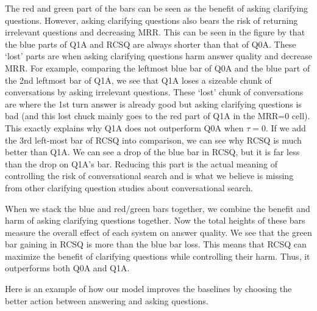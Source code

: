 \documentclass[format=acmsmall, review=False, screen=true]{acmart}
\begin{document}
The red and green part of the bars can be seen as the benefit of asking clarifying questions. However, asking clarifying questions also bears the risk of returning irrelevant questions and decreasing MRR. This can be seen in the figure by that the blue parts of Q1A and RCSQ are always shorter than that of Q0A. These `lost' parts are when asking clarifying questions harm answer quality and decrease MRR. For example, comparing the leftmost blue bar of Q0A and the blue part of the 2nd leftmost bar of Q1A, we see that Q1A loses a sizeable chunk of conversations by asking irrelevant questions. These `lost' chunk of conversations are where the 1st turn answer is already good but asking clarifying questions is bad (and this lost chuck mainly goes to the red part of Q1A in the MRR=0 cell). This exactly explains why Q1A does not outperform Q0A when $\tau=0$. If we add the 3rd left-most bar of RCSQ into comparison, we can see why RCSQ is much better than Q1A. We can see a drop of the blue bar in RCSQ, but it is far less than the drop on Q1A's bar. Reducing this part is the actual meaning of controlling the risk of conversational search and is what we believe is missing from other clarifying question studies about conversational search.
    
When we stack the blue and red/green bars together, we combine the benefit and harm of asking clarifying questions together. Now the total heights of these bars measure the overall effect of each system on answer quality. We see that the green bar gaining in RCSQ is more than the blue bar loss. This means that RCSQ can maximize the benefit of clarifying questions while controlling their harm. Thus, it outperforms both Q0A and Q1A.

Here is an example of how our model improves the baselines by choosing the better action between answering and asking questions.
\end{document}

